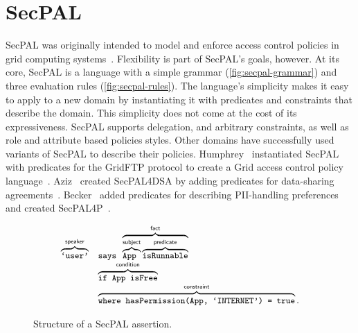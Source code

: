 \documentclass[thesis.tex]{subfiles}
\begin{document}
\section{SecPAL}

SecPAL was originally intended to model and enforce access control policies
    in grid computing systems~\cite{becker_secpal:_2010}. Flexibility is part of
    SecPAL's goals, however. At its core, SecPAL is a language with a simple grammar
    (\autoref{fig:secpal-grammar}) and three evaluation rules
    (\autoref{fig:secpal-rules}). The language's simplicity makes it easy to apply
    to a new domain by instantiating it with predicates and constraints that
    describe the domain. This simplicity does not come at the cost of its
    expressiveness. SecPAL supports delegation, and arbitrary constraints, as well
    as role and attribute based policies styles. Other domains have successfully
    used variants of SecPAL to describe their policies. Humphrey~\etal{} instantiated
    SecPAL with predicates for the GridFTP protocol to create a Grid access control
    policy language~\cite{humphrey_fine-grained_2007}. Aziz~\etal{} created SecPAL4DSA
    by adding predicates for data-sharing agreements~\cite{aziz_secpal4dsa:_2011}.
    Becker~\etal{} added predicates for describing \ac{PII}-handling preferences and
    created SecPAL4P~\cite{becker_framework_2009}.

\begin{figure}
  \newcommand{\bracetext}[1]{\text{\sffamily #1}}
  \newcommand{\smalltext}[1]{\text{\ttfamily\small #1}}
  \centering
    \begin{equation*}\small
      \begin{array}{r l}\footnotesize
        \overbrace{\smalltext{`user'}}^{\bracetext{speaker}} &
        \smalltext{ says }\overbrace{\overbrace{\smalltext{ App }}^{\bracetext{subject}}\overbrace{\smalltext{ isRunnable}}^{\bracetext{predicate}}}^{\bracetext{fact}} \\
        & \overbrace{\smalltext{ if App isFree}}^{\bracetext{condition}} \\
        & \overbrace{\smalltext{ where hasPermission(App, `INTERNET') = true}}^{\bracetext{constraint}}.
      \end{array}
    \end{equation*}
  \caption{Structure of a SecPAL assertion.}
  \label{fig:assertion}
\end{figure}
\end{document}
